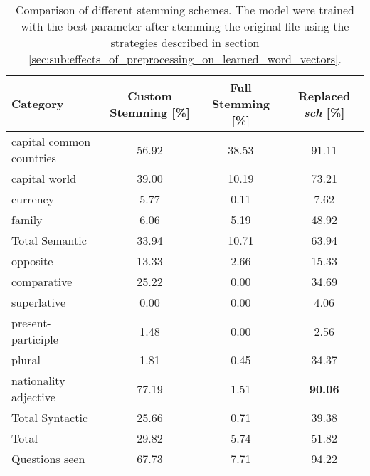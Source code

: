\begin{table}[h]
\centering
\small
\caption{Comparison of different stemming schemes. The model were trained
  with the best parameter after stemming the original file using the
  strategies described in section \ref{sec:sub:effects_of_preprocessing_on_learned_word_vectors}. } 
\label{tab:stemming_comparisson}
\small
\begin{tabular}{|l|c|c|c|}
\hline
 Category                  &  Custom Stemming [\%]  &  Full Stemming [\%]  &  Replaced \emph{sch} [\%]  \\
\hline
 capital common countries  &                 56.92  &               38.53  &                     91.11  \\
 capital world             &                 39.00  &               10.19  &                     73.21  \\
 currency                  &                  5.77  &                0.11  &                      7.62  \\
 family                    &                  6.06  &                5.19  &                     48.92  \\
\hline
 Total Semantic            &                 33.94  &               10.71  &                     63.94  \\
\hline
 opposite                  &                 13.33  &                2.66  &                     15.33  \\
 comparative               &                 25.22  &                0.00  &                     34.69  \\
 superlative               &                  0.00  &                0.00  &                      4.06  \\
 present-participle        &                  1.48  &                0.00  &                      2.56  \\
 plural                    &                  1.81  &                0.45  &                     34.37  \\
 nationality adjective     &                 77.19  &                1.51  &            \textbf{90.06}  \\
\hline
 Total Syntactic            &                 25.66  &                0.71  &                     39.38  \\
\hline
 Total                     &                 29.82  &                5.74  &                     51.82  \\
\hline
 Questions seen            &                 67.73  &                7.71  &                     94.22  \\
\hline
\end{tabular}
\end{table}


